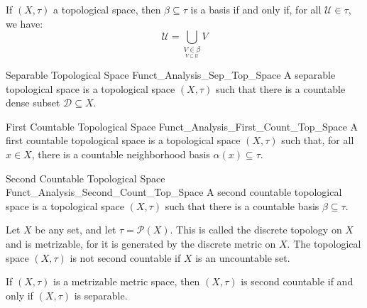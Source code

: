 \documentclass[crop=false,class=book,oneside]{standalone}                      %
\begin{document}
            \begin{theorem}
                If $(X,\tau)$ a topological space, then
                $\beta\subseteq\tau$ is a basis if and only if,
                for all $\mathcal{U}\in\tau$, we have:
                \begin{equation}
                    \mathcal{U}=
                    \bigcup_{\underset{V\subseteq\mathcal{U}}
                        {V\in\beta}}V
                \end{equation}
            \end{theorem}
            \begin{ldefinition}{Separable Topological Space}
                  {Funct_Analysis_Sep_Top_Space}
                A separable topological space is a topological
                space $(X,\tau)$ such that there is a countable
                dense subset $\mathcal{D}\subseteq{X}$.
            \end{ldefinition}
            \begin{ldefinition}{First Countable Topological Space}
                  {Funct_Analysis_First_Count_Top_Space}
                A first countable topological space is a
                topological space $(X,\tau)$ such that, for
                all $x\in{X}$, there is a countable neighborhood
                basis $\alpha(x)\subseteq\tau$.
            \end{ldefinition}
            \begin{ldefinition}{Second Countable Topological Space}
                  {Funct_Analysis_Second_Count_Top_Space}
                A second countable topological space is a
                topological space $(X,\tau)$ such that there is
                a countable basis $\beta\subseteq\tau$.
            \end{ldefinition}
            \begin{lexample}
                Let $X$ be any set, and let $\tau=\mathcal{P}(X)$.
                This is called the discrete topology on $X$
                and is metrizable, for it is generated by the
                discrete metric on $X$. The topological space
                $(X,\tau)$ is not second countable if $X$ is an
                uncountable set.
            \end{lexample}
            \begin{theorem}
                If $(X,\tau)$ is a metrizable metric space, then
                $(X,\tau)$ is second countable if and only if
                $(X,\tau)$ is separable.
            \end{theorem}
\end{document}
